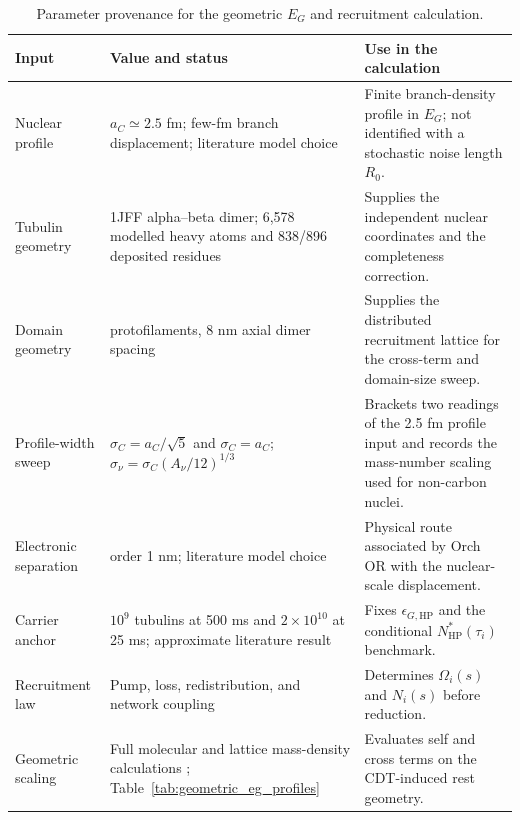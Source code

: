 \begin{table}[H]
\centering
\scriptsize
\renewcommand{\arraystretch}{0.88}
\begin{tabular}{@{}
  >{\raggedright\arraybackslash}p{3.2cm}
  >{\raggedright\arraybackslash}p{4.0cm}
  >{\raggedright\arraybackslash}p{5.2cm}@{}}
\toprule
Input & Value and status & Use in the calculation \\
\midrule
Nuclear profile & $a_C\simeq2.5$ fm; few-fm branch displacement; literature model choice \citep{hameroff2014} & Finite branch-density profile in $E_G$; not identified with a stochastic noise length $R_0$. \\
Tubulin geometry & 1JFF alpha--beta dimer; 6,578 modelled heavy atoms and 838/896 deposited residues \citep{lowe2001} & Supplies the independent nuclear coordinates and the completeness correction. \\
Domain geometry & 13 protofilaments, 8 nm axial dimer spacing \citep{fourniol2010} & Supplies the distributed recruitment lattice for the cross-term and domain-size sweep. \\
Profile-width sweep & $\sigma_C=a_C/\sqrt{5}$ and $\sigma_C=a_C$; $\sigma_\nu=\sigma_C(A_\nu/12)^{1/3}$ & Brackets two readings of the 2.5 fm profile input and records the mass-number scaling used for non-carbon nuclei. \\
Electronic separation & order 1 nm; literature model choice \citep{hameroff2014} & Physical route associated by Orch OR with the nuclear-scale displacement. \\
Carrier anchor & $10^9$ tubulins at 500 ms and $2\times10^{10}$ at 25 ms; approximate literature result \citep{hameroff2014} & Fixes $\epsilon_{G,\mathrm{HP}}$ and the conditional $N_{\mathrm{HP}}^*(\tau_i)$ benchmark. \\
Recruitment law & Pump, loss, redistribution, and network coupling \citep{zhang2019frohlich,wang2022frohlich,diazpalencia2025} & Determines $\Omega_i(s)$ and $N_i(s)$ before reduction. \\
Geometric scaling & Full molecular and lattice mass-density calculations \citep{figurato2024,tomaz2024}; Table~\ref{tab:geometric_eg_profiles} & Evaluates self and cross terms on the CDT-induced rest geometry. \\
\bottomrule
\end{tabular}
\caption{Parameter provenance for the geometric $E_G$ and recruitment calculation.}
\label{tab:orch_or_parameter_provenance}
\end{table}

